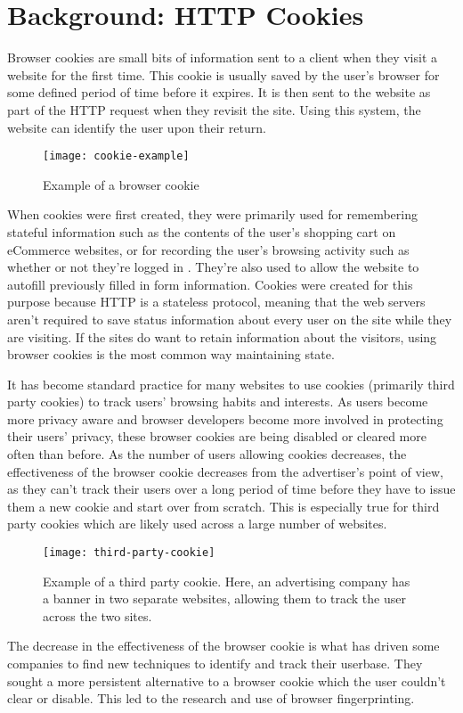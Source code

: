 \chapter{Background: HTTP Cookies}

Browser cookies are small bits of information sent to a client when they visit a website for the first time.
This cookie is usually saved by the user's browser for some defined period of time before it expires.
It is then sent to the website as part of the HTTP request when they revisit the site.
Using this system, the website can identify the user upon their return.

\begin{figure}[h]
\caption{Example of a browser cookie}
\texttt{[image: cookie-example]}
\centering
\end{figure}

When cookies were first created, they were primarily used for remembering stateful information such as the contents of the user's shopping cart on eCommerce websites, or for recording the user's browsing activity such as whether or not they're logged in \citep{cookiesbackground}.
They're also used to allow the website to autofill previously filled in form information.
Cookies were created for this purpose because HTTP is a stateless protocol, meaning that the web servers aren't required to save status information about every user on the site while they are visiting.
If the sites do want to retain information about the visitors, using browser cookies is the most common way maintaining state.

It has become standard practice for many websites to use cookies (primarily third party cookies) to track users' browsing habits and interests.
As users become more privacy aware and browser developers become more involved in protecting their users' privacy, these browser cookies are being disabled or cleared more often than before.
As the number of users allowing cookies decreases, the effectiveness of the browser cookie decreases from the advertiser's point of view, as they can't track their users over a long period of time before they have to issue them a new cookie and start over from scratch.
This is especially true for third party cookies which are likely used across a large number of websites.

\begin{figure}[h]
\caption{Example of a third party cookie.
Here, an advertising company has a banner in two separate websites, allowing them to track the user across the two sites.}
\texttt{[image: third-party-cookie]}
\centering
\end{figure}

The decrease in the effectiveness of the browser cookie is what has driven some companies to find new techniques to identify and track their userbase.
They sought a more persistent alternative to a browser cookie which the user couldn't clear or disable.
This led to the research and use of browser fingerprinting.

